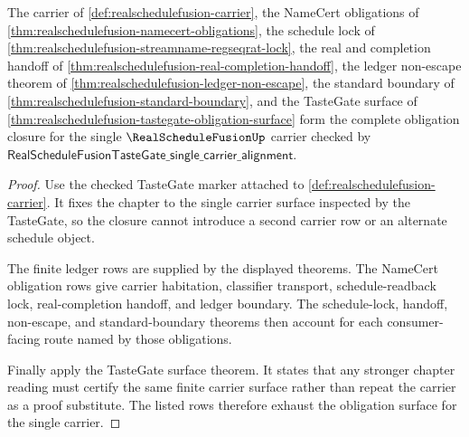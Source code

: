 \begin{theorem}
\label{thm:realschedulefusion-tastegate-obligation-closure}
The carrier of \autoref{def:realschedulefusion-carrier}, the NameCert obligations of \autoref{thm:realschedulefusion-namecert-obligations}, the schedule lock of \autoref{thm:realschedulefusion-streamname-regseqrat-lock}, the real and completion handoff of \autoref{thm:realschedulefusion-real-completion-handoff}, the ledger non-escape theorem of \autoref{thm:realschedulefusion-ledger-non-escape}, the standard boundary of \autoref{thm:realschedulefusion-standard-boundary}, and the TasteGate surface of \autoref{thm:realschedulefusion-tastegate-obligation-surface} form the complete obligation closure for the single $\RealScheduleFusionUp$ carrier checked by $\mathsf{RealScheduleFusionTasteGate\_single\_carrier\_alignment}$.
\end{theorem}
\begin{proof}
Use the checked TasteGate marker attached to \autoref{def:realschedulefusion-carrier}. It fixes the chapter to the single carrier surface inspected by the TasteGate, so the closure cannot introduce a second carrier row or an alternate schedule object.

The finite ledger rows are supplied by the displayed theorems. The NameCert obligation rows give carrier habitation, classifier transport, schedule-readback lock, real-completion handoff, and ledger boundary. The schedule-lock, handoff, non-escape, and standard-boundary theorems then account for each consumer-facing route named by those obligations.

Finally apply the TasteGate surface theorem. It states that any stronger chapter reading must certify the same finite carrier surface rather than repeat the carrier as a proof substitute. The listed rows therefore exhaust the obligation surface for the single carrier.
\end{proof}

